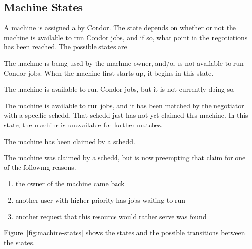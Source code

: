 \subsection{\label{sec:States}
Machine States}

A machine is assigned a  by Condor.
The state
depends on whether or not the machine is available to run Condor
jobs, and if so, what point in the negotiations has been reached.
The possible states are

\begin{description}
  
\item[Owner] The machine is being used by the machine owner, and/or
  is not available to run Condor jobs.
  When the machine first starts up, it begins in this state.
  
\item[Unclaimed] The machine is available to run Condor jobs, but it is
  not currently doing so.
  
\item[Matched] The machine is available to run jobs, and it has been
  matched by the negotiator with a specific schedd.
  That schedd just has not yet claimed this machine.
  In this state, the machine is unavailable for further matches.

\item[Claimed] The machine has been claimed by a schedd. 
  
\item[Preempting] The machine was claimed by a schedd, but is now
  preempting that claim for one of the following reasons.
  \begin{enumerate}
  \item the owner of the machine came back
  \item another user with higher priority has jobs waiting to run
  \item another request that this resource would rather serve was found
  \end{enumerate}

\end{description}

Figure~\ref{fig:machine-states} shows
the states and the possible transitions between the states.

